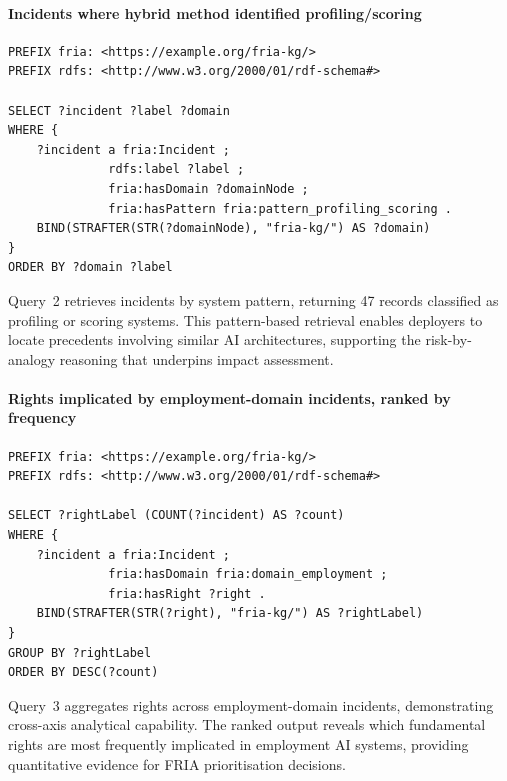 \paragraph{Incidents where hybrid method identified profiling/scoring}

\begin{lstlisting}[language=SPARQL,basicstyle=\ttfamily\footnotesize,breaklines=true,caption={Incidents where hybrid method identified profiling/scoring}]
PREFIX fria: <https://example.org/fria-kg/>
PREFIX rdfs: <http://www.w3.org/2000/01/rdf-schema#>

SELECT ?incident ?label ?domain
WHERE {
    ?incident a fria:Incident ;
              rdfs:label ?label ;
              fria:hasDomain ?domainNode ;
              fria:hasPattern fria:pattern_profiling_scoring .
    BIND(STRAFTER(STR(?domainNode), "fria-kg/") AS ?domain)
}
ORDER BY ?domain ?label
\end{lstlisting}

Query~2 retrieves incidents by system pattern, returning 47 records classified as profiling or scoring systems. This pattern-based retrieval enables deployers to locate precedents involving similar AI architectures, supporting the risk-by-analogy reasoning that underpins impact assessment.

\paragraph{Rights implicated by employment-domain incidents, ranked by frequency}

\begin{lstlisting}[language=SPARQL,basicstyle=\ttfamily\footnotesize,breaklines=true,caption={Rights implicated by employment-domain incidents, ranked by frequency}]
PREFIX fria: <https://example.org/fria-kg/>
PREFIX rdfs: <http://www.w3.org/2000/01/rdf-schema#>

SELECT ?rightLabel (COUNT(?incident) AS ?count)
WHERE {
    ?incident a fria:Incident ;
              fria:hasDomain fria:domain_employment ;
              fria:hasRight ?right .
    BIND(STRAFTER(STR(?right), "fria-kg/") AS ?rightLabel)
}
GROUP BY ?rightLabel
ORDER BY DESC(?count)
\end{lstlisting}

Query~3 aggregates rights across employment-domain incidents, demonstrating cross-axis analytical capability. The ranked output reveals which fundamental rights are most frequently implicated in employment AI systems, providing quantitative evidence for FRIA prioritisation decisions.

